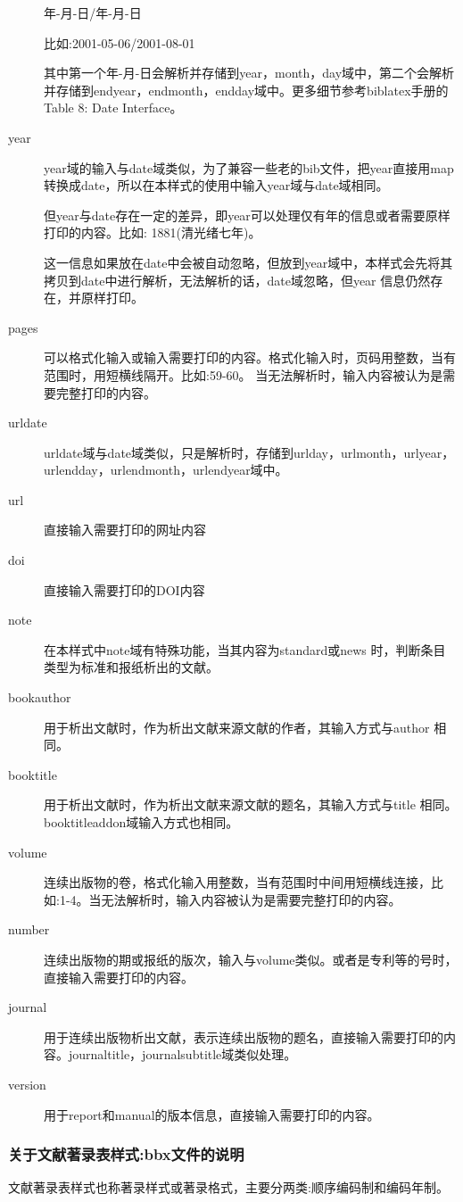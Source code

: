 \begin{description}
      年-月-日/年-月-日

      比如:2001-05-06/2001-08-01

      其中第一个年-月-日会解析并存储到year，month，day域中，第二个会解析并存储到endyear，endmonth，endday域中。更多细节参考biblatex手册的Table 8: Date Interface。

  \item[year] year域的输入与date域类似，为了兼容一些老的bib文件，把year直接用map 转换成date，所以在本样式的使用中输入year域与date域相同。

      但year与date存在一定的差异，即year可以处理仅有年的信息或者需要原样打印的内容。比如:
      1881(清光绪七年)。

      这一信息如果放在date中会被自动忽略，但放到year域中，本样式会先将其拷贝到date中进行解析，无法解析的话，date域忽略，但year 信息仍然存在，并原样打印。

  \item[pages] 可以格式化输入或输入需要打印的内容。格式化输入时，页码用整数，当有范围时，用短横线隔开。比如:59-60。 当无法解析时，输入内容被认为是需要完整打印的内容。
  \item[urldate] urldate域与date域类似，只是解析时，存储到urlday，urlmonth，urlyear，urlendday，urlendmonth，urlendyear域中。
  \item[url] 直接输入需要打印的网址内容
  \item[doi] 直接输入需要打印的DOI内容
  \item[note] 在本样式中note域有特殊功能，当其内容为standard或news 时，判断条目类型为标准和报纸析出的文献。
  \item[bookauthor] 用于析出文献时，作为析出文献来源文献的作者，其输入方式与author 相同。
  \item[booktitle] 用于析出文献时，作为析出文献来源文献的题名，其输入方式与title 相同。booktitleaddon域输入方式也相同。
  \item[volume] 连续出版物的卷，格式化输入用整数，当有范围时中间用短横线连接，比如:1-4。当无法解析时，输入内容被认为是需要完整打印的内容。
  \item[number] 连续出版物的期或报纸的版次，输入与volume类似。或者是专利等的号时，直接输入需要打印的内容。
  \item[journal] 用于连续出版物析出文献，表示连续出版物的题名，直接输入需要打印的内容。journaltitle，journalsubtitle域类似处理。
   \item[version] 用于report和manual的版本信息，直接输入需要打印的内容。
\end{description}


\subsubsection{关于文献著录表样式:bbx文件的说明}\label{sec:usage:bbx}
文献著录表样式也称著录样式或著录格式，主要分两类:顺序编码制和编码年制。

